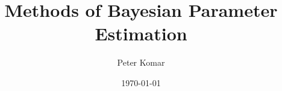 \documentclass[10pt,oneside]{article}
\author{Peter Komar}
\title{Methods of Bayesian Parameter Estimation}
\date{\today}
\begin{document}
\newcommand{\bel}{\begin{equation}}
\newcommand{\eel}{\end{equation}}
\newcommand{\be}{\begin{equation*}}
\newcommand{\ee}{\end{equation*}}

\newcommand{\bal}{\begin{eqnarray}}
\newcommand{\eal}{\end{eqnarray}}
\newcommand{\ba}{\begin{eqnarray*}}
\newcommand{\ea}{\end{eqnarray*}}

\newcommand{\ket}[1]{| #1 \rangle}
\newcommand{\Ket}[1]{\left| #1 \right\rangle}
\newcommand{\bra}[1]{\langle #1 |}
\newcommand{\Bra}[1]{\left\langle #1 \right|}

\newcommand{\no}{\noindent}

\newcommand{\ev}[1]{\langle #1 \rangle}
\newcommand{\Ev}[1]{\left\langle #1 \right\rangle}
\newcommand{\Tr}{\text{Tr}\,}
\newcommand{\T}{^\top}
\newcommand{\+}{^\dagger}
\newcommand{\s}{^\ast}
\newcommand{\PP}{\mathcal{P}}
\newcommand{\eqE}{= \!\!\!\!\!^{{}^{E}}\,}

\renewcommand{\d}[1]{\!d #1 \;}

\newcommand{\bE}{{\mathbf E}}
\newcommand{\bB}{{\mathbf B}}
\newcommand{\bF}{{\mathbf F}}
\newcommand{\bJ}{{\mathbf J}}
\newcommand{\bv}{{\mathbf v}}
\newcommand{\eps}{\varepsilon}
\newcommand{\br}{\mathbf r}
\newcommand{\bk}{\mathbf k}
\newcommand{\hatx}{\hat{\mathbf{x}}}
\newcommand{\haty}{\hat{\mathbf{y}}}
\newcommand{\hatz}{\hat{\mathbf{z}}}

\renewcommand{\vec}[1]{{\bf #1}}
\newcommand{\mat}[1]{{\bf #1}}
\end{document}
